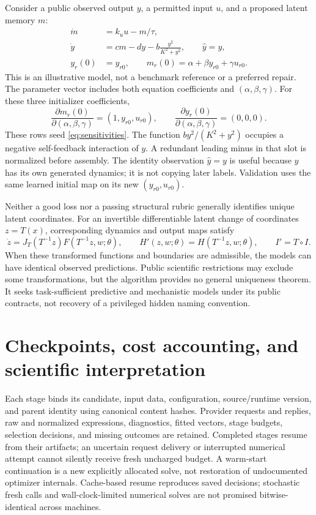 \documentclass[11pt]{article}
\begin{document}
Consider a public observed output $y$, a permitted input $u$, and a proposed
latent memory $m$:
\begin{align}
 \dot m&=k_u u-m/\tau,\\
 \dot y&=c m-d y-b\frac{y^2}{K^2+y^2},\qquad \widehat y=y,\\
 y_r(0)&=y_{r0},\qquad
 m_r(0)=\alpha+\beta y_{r0}+\gamma u_{r0}.
\end{align}
This is an illustrative model, not a benchmark reference or a preferred repair.
The parameter vector includes both equation coefficients and
$(\alpha,\beta,\gamma)$. For these three initializer coefficients,
\begin{equation}
 \frac{\partial m_r(0)}{\partial(\alpha,\beta,\gamma)}
       =(1,y_{r0},u_{r0}),\qquad
 \frac{\partial y_r(0)}{\partial(\alpha,\beta,\gamma)}=(0,0,0).
\end{equation}
These rows seed \eqref{eq:sensitivities}. The function $b y^2/(K^2+y^2)$ occupies
a negative self-feedback interaction of $y$. A redundant leading minus in that
slot is normalized before assembly. The identity observation $\widehat y=y$ is
useful because $y$ has its own generated dynamics; it is not copying later labels.
Validation uses the same learned initial map on its new $(y_{r0},u_{r0})$.

Neither a good loss nor a passing structural rubric generally identifies unique
latent coordinates. For an invertible differentiable latent change of coordinates
$z=T(x)$, corresponding dynamics and output maps satisfy
\begin{equation}
 \dot z=J_T(T^{-1}z)F(T^{-1}z,w;\theta),\qquad
 H'(z,w;\theta)=H(T^{-1}z,w;\theta),\qquad I'=T\circ I.
\end{equation}
When these transformed functions and boundaries are admissible, the models can
have identical observed predictions. Public scientific restrictions may exclude
some transformations, but the algorithm provides no general uniqueness theorem.
It seeks task-sufficient predictive and mechanistic models under its public
contracts, not recovery of a privileged hidden naming convention.

\section{Checkpoints, cost accounting, and scientific interpretation}
\label{sec:provenance}

Each stage binds its candidate, input data, configuration, source/runtime version,
and parent identity using canonical content hashes. Provider requests and replies,
raw and normalized expressions, diagnostics, fitted vectors, stage budgets,
selection decisions, and missing outcomes are retained. Completed stages resume
from their artifacts; an uncertain request delivery or interrupted numerical
attempt cannot silently receive fresh uncharged budget. A warm-start continuation
is a new explicitly allocated solve, not restoration of undocumented optimizer
internals. Cache-based resume reproduces saved decisions; stochastic fresh calls
and wall-clock-limited numerical solves are not promised bitwise-identical across
machines.
\end{document}
